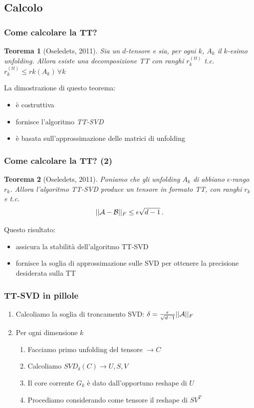 \documentclass[compress]{beamer}
\newcommand{\nota}[1]{\textcolor{red}{#1}}
\theoremstyle{definition}
\theoremstyle{plain}
\newtheorem{teorema}{Teorema}
\begin{document}
\subsection{Calcolo}
\begin{frame}
\frametitle{Come calcolare la TT?}
\begin{teorema}[Oseledets, 2011]
Sia \A un $d$-tensore e sia, per ogni $k$, $A_k$ il $k$-esimo unfolding.
Allora esiste una decomposizione TT con ranghi $r_k^{(tt)}$ t.c. $r_k^{(tt)} \leq rk(A_k) \, \forall k$
\end{teorema}

\vspace{5mm}
La dimostrazione di questo teorema:
\begin{itemize}
	\item è costruttiva
	\item fornisce l'algoritmo \emph{TT-SVD}
	\item è basata sull'approssimazione delle matrici di unfolding
\end{itemize}
\end{frame}

\begin{frame}
\frametitle{Come calcolare la TT? (2)}
\begin{teorema}[Oseledets, 2011]
Poniamo che gli unfolding $A_k$ di \A abbiano $\epsilon$-rango $r_k$.
Allora l'algoritmo TT-SVD produce un tensore \B in formato TT, con ranghi $r_k$ e t.c. 
\begin{equation*}
    ||\mathcal{A} - \mathcal{B} ||_F \le \epsilon \sqrt{d-1}\, .
\end{equation*}
\end{teorema}

\vspace{5mm}
Questo risultato:
\begin{itemize}
	\item assicura la stabilità dell'algoritmo TT-SVD
	\item fornisce la soglia di approssimazione sulle SVD per ottenere la precisione desiderata sulla TT
\end{itemize}
\end{frame}

\begin{frame}
\frametitle{TT-SVD in pillole}
\begin{enumerate}
	\item Calcoliamo la soglia di troncamento SVD: $\delta = \frac{\epsilon}{\sqrt{d-1}} ||\mathcal{A}||_F$
	\item Per ogni dimensione $k$
		\begin{enumerate}
			\item Facciamo primo unfolding del tensore $\rightarrow C$
			\item Calcoliamo $SVD_{\delta}(C) \rightarrow U,S,V$
			\item Il core corrente $G_k$ è dato dall'opportuno reshape di $U$
			\item Procediamo considerando come tensore il reshape di $SV^T$
		\end{enumerate}
\end{enumerate}
\end{frame}
\end{document}
